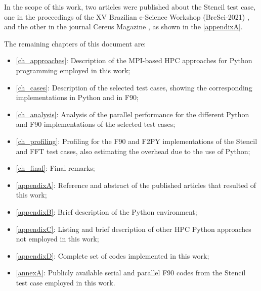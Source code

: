In the scope of this work, two articles were published about the Stencil test case, one in the proceedings of the XV Brazilian e-Science Workshop (BreSci-2021) \cite {Miranda2021}, and the other in the journal Cereus Magazine \cite {Miranda2021a}, as shown in the \autoref {appendixA}.

The remaining chapters of this document are: 

\begin{itemize}

\item \autoref {ch_approaches}: Description of the MPI-based HPC approaches for Python programming employed in this work;

\item \autoref {ch_cases}: Description of the selected test cases, showing the corresponding implementations in Python and in F90;

\item \autoref {ch_analysis}: Analysis of the parallel performance for the different Python and F90 implementations of the selected test cases;

\item \autoref {ch_profiling}: Profiling for the F90 and F2PY implementations of the Stencil and FFT test cases, also estimating the overhead due to the use of Python;

\item \autoref {ch_final}: Final remarks;

\item \autoref {appendixA}: Reference and abstract of the published articles that resulted of this work;

\item \autoref {appendixB}: Brief description of the Python environment;

\item \autoref {appendixC}: Listing and brief description of other HPC Python approaches not employed in this work;

\item \autoref {appendixD}: Complete set of codes implemented in this work;

\item \autoref {annexA}: Publicly available serial and parallel F90 codes from the Stencil test case employed in this work.

\end{itemize}

%
%
%
%
%
%
%
